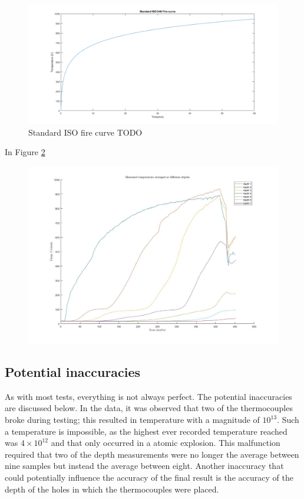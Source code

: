 	\begin{figure}[H]
	\centering 
	\includegraphics[width=\linewidth]{figures/firecurve.png}
	\caption{Standard ISO fire curve TODO}
	\label{firecurve_fig}
	\end{figure}
	In Figure \ref{measured_fig} 
	\begin{figure}[H]
	\label{measured_fig}
	\centering
	\includegraphics[width=5.5in,]{figures/measured_data.jpg}
\end{figure}

	\subsection{Potential inaccuracies}
	As with most tests, everything is not always perfect. 
	The potential inaccuracies are discussed below. 	
	In the data, it was observed that two of the thermocouples broke during testing; this resulted in temperature with a magnitude of $10^{13}$. 
	Such a temperature is impossible, as the highest ever recorded temperature reached was $4\times 10^{12}$ and that only occurred in a atomic explosion. %
	This malfunction required that two of the depth measurements were no longer the average between nine samples but instead the average between eight.
	Another inaccuracy that could potentially influence the accuracy of the final result is the accuracy of the depth of the holes in which the thermocouples were placed. 
	
